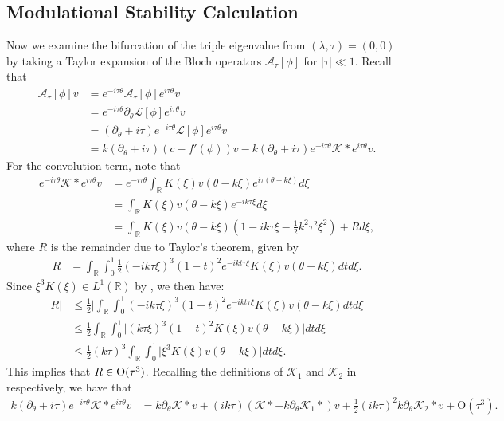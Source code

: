 \documentclass[11pt,leqno]{article}
\numberwithin{equation}{section}
\renewcommand\d{\partial}
\newcommand{\R}{\mathbb R}
\theoremstyle{definition}
\begin{document}
\subsection{Modulational Stability Calculation}
Now we examine the bifurcation of the triple eigenvalue from $ (\lambda,\tau) = (0,0) $ by taking a Taylor expansion of the Bloch operators $\mathcal{A}_\tau[\phi]$ for $|\tau|\ll 1$.  Recall that
\begin{align*}
	\mathcal{A}_\tau[\phi]v &= e^{-i\tau\theta}\mathcal{A}_{\tau}[\phi]e^{i\tau\theta}v\\
	&= e^{-i\tau\theta}\d_\theta \mathcal{L}[\phi]e^{i\tau\theta}v\\
	&= (\partial_{\theta} + i\tau)e^{-i\tau\theta}\mathcal{L}[\phi]e^{i\tau\theta}v\\
	&= k(\d_\theta + i\tau)(c-f'(\phi))v - k(\d_\theta + i\tau) e^{-i\tau\theta}\mathcal{K}*e^{i\tau\theta}v.
\end{align*}
For the convolution term, note that
\begin{align*}
	e^{-i\tau\theta}\mathcal{K}*e^{i\tau\theta}v &= e^{-i\tau\theta}\int_{\R}K(\xi)v(\theta-k\xi)e^{i\tau(\theta-k\xi)}d\xi\\
	&= \int_{\R}K(\xi)v(\theta-k\xi)e^{-ik\tau\xi}d\xi\\
	&= \int_{\R}K(\xi)v(\theta-k\xi)\left(1 - ik\tau\xi - \frac{1}{2}k^{2}\tau^{2}\xi^{2}\right) + Rd\xi,
\end{align*}
where $ R $ is the remainder due to Taylor's theorem, given by
\begin{align*}
	R &= \int_{\R}\int_{0}^{1}\frac{1}{2}(-ik\tau\xi)^{3}(1-t)^{2}e^{-ikt\tau\xi}K(\xi)v(\theta-k\xi)dtd\xi.
\end{align*}
Since $ \xi^{3}K(\xi)\in L^{1}(\R) $ by , we then have:
\begin{align*}
	|R| &\leq \frac{1}{2}\bigg|\int_{\R}\int_{0}^{1}(-ik\tau\xi)^{3}(1-t)^{2}e^{-ikt\tau\xi}K(\xi)v(\theta-k\xi)dtd\xi\bigg|\\
	&\leq \frac{1}{2}\int_{\R}\int_{0}^{1}\bigg|(k\tau\xi)^{3}(1-t)^{2}K(\xi)v(\theta-k\xi)\bigg|dtd\xi\\
	&\leq \frac{1}{2}(k\tau)^{3}\int_{\R}\int_{0}^{1}\bigg|\xi^{3}K(\xi)v(\theta-k\xi)\bigg|dtd\xi.
\end{align*}
This implies that $ R \in \rm O(\tau^{3})$. Recalling the definitions of $\mathcal{K}_{1}$ and $\mathcal{K}_{2}$ in  respectively, we have that
\begin{align*}
	k(\d_\theta + i\tau) e^{-i\tau\theta}\mathcal{K}*e^{i\tau\theta}v &= k\partial_{\theta}\mathcal{K}*v + (ik\tau)\left(\mathcal{K}* - k\partial_{\theta}\mathcal{K}_{1}*\right)v + \frac{1}{2}(ik\tau)^{2}k\partial_{\theta}\mathcal{K}_{2}*v +  \mathrm{O}(\tau^{3}).
\end{align*}
\end{document}
